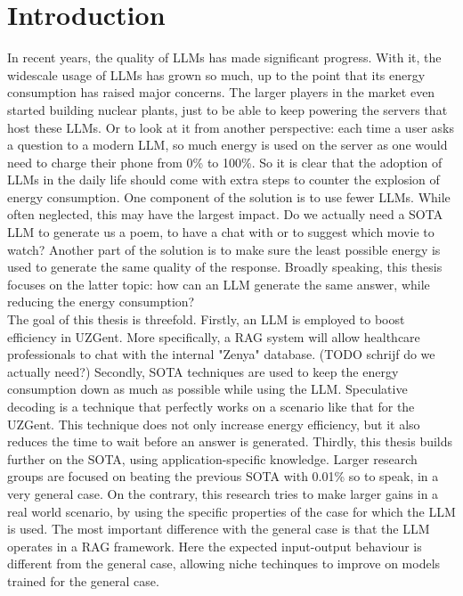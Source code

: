 \section{Introduction}
In recent years, the quality of LLMs has made significant progress. With it, the widescale usage of LLMs has grown so much, up to the point that its energy consumption has raised major concerns. The larger players in the market even started building nuclear plants, just to be able to keep powering the servers that host these LLMs. Or to look at it from another perspective: each time a user asks a question to a modern LLM, so much energy is used on the server as one would need to charge their phone from 0\% to 100\%. So it is clear that the adoption of LLMs in the daily life should come with extra steps to counter the explosion of energy consumption. One component of the solution is to use fewer LLMs. While often neglected, this may have the largest impact. Do we actually need a SOTA LLM to generate us a poem, to have a chat with or to suggest which movie to watch? Another part of the solution is to make sure the least possible energy is used to generate the same quality of the response. Broadly speaking, this thesis focuses on the latter topic: how can an LLM generate the same answer, while reducing the energy consumption?\\

The goal of this thesis is threefold. Firstly, an LLM is employed to boost efficiency in UZGent. More specifically, a RAG system will allow healthcare professionals to chat with the internal "Zenya" database. (TODO schrijf do we actually need?) Secondly, SOTA techniques are used to keep the energy consumption down as much as possible while using the LLM. Speculative decoding is a technique that perfectly works on a scenario like that for the UZGent. This technique does not only increase energy efficiency, but it also reduces the time to wait before an answer is generated. Thirdly, this thesis builds further on the SOTA, using application-specific knowledge. Larger research groups are focused on beating the previous SOTA with 0.01\% so to speak, in a very general case. On the contrary, this research tries to make larger gains in a real world scenario, by using the specific properties of the case for which the LLM is used. The most important difference with the general case is that the LLM operates in a RAG framework. Here the expected input-output behaviour is different from the general case, allowing niche techinques to improve on models trained for the general case.\\

